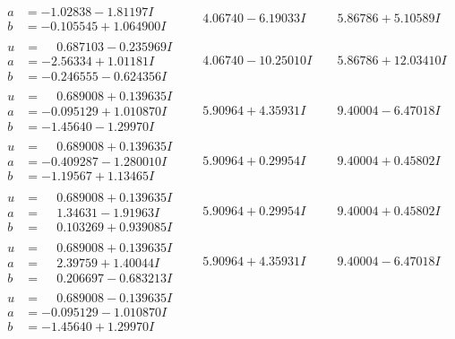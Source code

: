 \documentclass[1p]{elsarticle_modified}
\theoremstyle{definition}
\begin{document}
$$\begin{array}{c|c|c}
\begin{aligned}
a &= -1.02838 - 1.81197 I \\
b &= -0.105545 + 1.064900 I\end{aligned}
 & \phantom{-}4.06740 - 6.19033 I & \phantom{-}5.86786 + 5.10589 I \\ \hline\begin{aligned}
u &= \phantom{-}0.687103 - 0.235969 I \\
a &= -2.56334 + 1.01181 I \\
b &= -0.246555 - 0.624356 I\end{aligned}
 & \phantom{-}4.06740 - 10.25010 I & \phantom{-}5.86786 + 12.03410 I \\ \hline\begin{aligned}
u &= \phantom{-}0.689008 + 0.139635 I \\
a &= -0.095129 + 1.010870 I \\
b &= -1.45640 - 1.29970 I\end{aligned}
 & \phantom{-}5.90964 + 4.35931 I & \phantom{-}9.40004 - 6.47018 I \\ \hline\begin{aligned}
u &= \phantom{-}0.689008 + 0.139635 I \\
a &= -0.409287 - 1.280010 I \\
b &= -1.19567 + 1.13465 I\end{aligned}
 & \phantom{-}5.90964 + 0.29954 I & \phantom{-}9.40004 + 0.45802 I \\ \hline\begin{aligned}
u &= \phantom{-}0.689008 + 0.139635 I \\
a &= \phantom{-}1.34631 - 1.91963 I \\
b &= \phantom{-}0.103269 + 0.939085 I\end{aligned}
 & \phantom{-}5.90964 + 0.29954 I & \phantom{-}9.40004 + 0.45802 I \\ \hline\begin{aligned}
u &= \phantom{-}0.689008 + 0.139635 I \\
a &= \phantom{-}2.39759 + 1.40044 I \\
b &= \phantom{-}0.206697 - 0.683213 I\end{aligned}
 & \phantom{-}5.90964 + 4.35931 I & \phantom{-}9.40004 - 6.47018 I \\ \hline\begin{aligned}
u &= \phantom{-}0.689008 - 0.139635 I \\
a &= -0.095129 - 1.010870 I \\
b &= -1.45640 + 1.29970 I\end{aligned}

\end{array}$$
\end{document}
